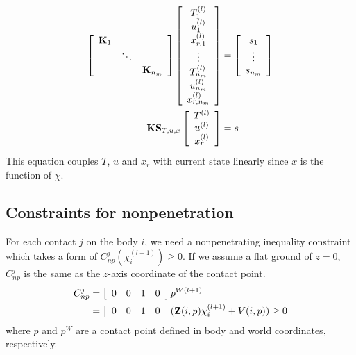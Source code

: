 \documentclass[a4paper,10pt]{article}
\begin{document}
\begin{align}
\left [
\begin{array}{ccc}
\mathbf{K}_1 &        &                  \\
             & \ddots &                  \\
             &        & \mathbf{K}_{n_m}
\end{array}
\right ]
\left [
\begin{array}{c}
T_1^{(l)} \\ u_1^{(l)} \\ x_{r,1}^{(l)} \\
\vdots\\
T_{n_m}^{(l)} \\ u_{n_m}^{(l)} \\ x_{r,n_m}^{(l)}
\end{array}
\right ]  & =
\left [
\begin{array}{c}
s_1 \\
\vdots \\
s_{n_m}
\end{array}
\right ]\notag\\
\mathbf{K}\mathbf{S}_{T,u,x} \left [
\begin{array}{c}
T^{(l)} \\ u^{(l)} \\ x_{r}^{(l)}
\end{array}
\right ] &= s\label{Muscle_fiber_constraint}
\end{align}
This equation couples $T$, $u$ and $x_r$ with current state linearly
since $x$ is the function of $\chi$.

\subsection{Constraints for nonpenetration}
For each contact $j$ on the body $i$, we need a nonpenetrating inequality constraint which
takes a form of $C_{np}^j (\chi^{(l+1)}_i) \geq 0$.
If we assume a flat ground of $z=0$, $C_{np}^j$ is the same as
the $z$-axis coordinate of the contact point.
\begin{align}
C_{np}^j & = \left [ \begin{array}{cccc} 0 & 0 & 1 & 0 \end{array} \right ] p^{W(l+1)} \notag\\
         & = \left [ \begin{array}{cccc} 0 & 0 & 1 & 0 \end{array} \right ] ( \mathbf{Z}(i,p) \chi^{(l+1)}_i + V(i,p) ) \geq 0
\end{align}
where $p$ and $p^W$ are a contact point defined in body and world coordinates, respectively.
\end{document}
